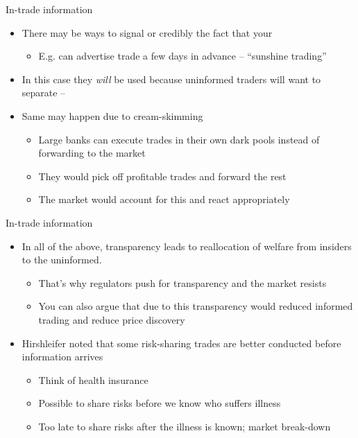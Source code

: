 \documentclass[english,10pt
,aspectratio=169
]{beamer}
\begin{document}
\begin{frame}{In-trade information}
	\begin{itemize}
		\item There may be ways to signal or credibly  the fact that your 
		\begin{itemize}
			\item E.g. can advertise trade a few days in advance -- ``sunshine trading''
		\end{itemize}
		\item In this case they \emph{will} be used because uninformed traders will want to separate -- 
		\item Same may happen due to \alert{cream-skimming}
		\begin{itemize}
			\item Large banks can execute trades in their own dark pools instead of forwarding to the market
			\item They would pick off profitable trades and forward the rest
			\item The market would account for this and react appropriately
		\end{itemize}
	\end{itemize}
\end{frame}


\begin{frame}{In-trade information}
	\begin{itemize}
		\item In all of the above, transparency leads to reallocation of welfare from insiders to the uninformed.
		\begin{itemize}
			\item That's why regulators push for transparency and the market resists
			\item You can also argue that due to this transparency would reduced informed trading and reduce price discovery
		\end{itemize}
		\item Hirshleifer noted that some risk-sharing trades are better conducted before information arrives
		\begin{itemize}
			\item Think of health insurance
			\item Possible to share risks before we know who suffers illness
			\item Too late to share risks after the illness is known; market break-down
		\end{itemize}
	\end{itemize}
\end{frame}
\end{document}
